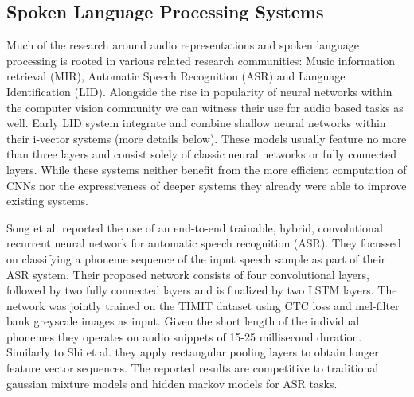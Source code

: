 \subsection{Spoken Language Processing Systems}
Much of the research around audio representations and spoken language processing is rooted in various related research communities: Music information retrieval (MIR), Automatic Speech Recognition (ASR) and Language Identification (LID). Alongside the rise in popularity of neural networks within the computer vision community we can witness their use for audio based tasks as well. Early LID system integrate and combine shallow neural networks within their i-vector systems (more details below).\cite{gonzalez2014automatic, han2013trap, matejka2014neural, richardson2015unified} These models usually feature no more than three layers and consist solely of classic neural networks or fully connected layers. While these systems neither benefit from the more efficient computation of CNNs nor the expressiveness of deeper systems they already were able to improve existing systems.

Song et al. reported the use of an end-to-end trainable, hybrid, convolutional recurrent neural network for automatic speech recognition (ASR).\cite{song2015end} They focussed on classifying a phoneme sequence of the input speech sample as part of their ASR system. Their proposed network consists of four convolutional layers, followed by two fully connected layers and is finalized by two LSTM layers. The network was jointly trained on the TIMIT dataset using CTC loss and mel-filter bank greyscale images as input. Given the short length of the individual phonemes they operates on audio snippets of 15-25 millisecond duration. Similarly to Shi et al. they apply rectangular pooling layers to obtain longer feature vector sequences.\cite{shi2016end} The reported results are competitive to traditional gaussian mixture models and hidden markov models for ASR tasks. 

